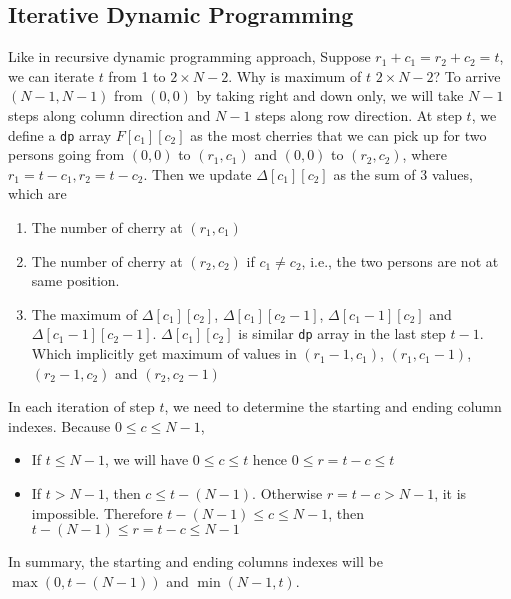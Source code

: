 \subsection{Iterative Dynamic Programming}
Like in recursive dynamic programming approach, Suppose $r_1+c_1=r_2+c_2=t$, we can iterate $t$ from 1 to $2\times N-2$. Why is maximum of $t$ $2\times N-2$? To arrive $(N-1,N-1)$ from $(0,0)$ by taking right and down only, we will take $N-1$ steps along column direction and $N-1$ steps along row direction. At step $t$, we define a \texttt{dp} array $F[c_1][c_2]$ as the most cherries that we can pick up for two persons going from $(0, 0)$ to $(r_1, c_1)$ and $(0, 0)$ to $(r_2, c_2)$, where $r_1 = t-c_1, r_2 = t-c_2$. Then we update $\Delta[c_1][c_2]$ as the sum of 3 values, which are 
\begin{enumerate}
\item The number of cherry at $(r_1, c_1)$
\item The number of cherry at $(r_2, c_2)$ if $c_1\neq c_2$, i.e., the two persons are not at same position.
\item The maximum of $\Delta[c_1][c_2]$, $\Delta[c_1][c_2-1]$, $\Delta[c_1-1][c_2]$ and $\Delta[c_1-1][c_2-1]$. $\Delta[c_1][c_2]$ is similar \texttt{dp} array in the last step $t-1$. Which implicitly get maximum of values in $(r_1-1, c_1)$, $(r_1, c_1-1)$, $(r_2-1, c_2)$ and $(r_2, c_2-1)$
\end{enumerate}
In each iteration of step $t$, we need to determine the starting and ending column indexes. Because $0\leq c\leq N-1$,
\begin{itemize}
\item If $t\leq N-1$, we will have $0\leq c \leq t$ hence $0\leq r=t-c\leq t$
\item If $t> N-1$, then $c \leq t-(N-1)$. Otherwise $r=t-c >N-1$, it is impossible. Therefore $t-(N-1) \leq c \leq N-1$, then $t-(N-1) \leq r=t-c\leq N-1$
\end{itemize}
In summary, the starting and ending columns indexes will be $\max(0, t-(N-1))$ and $\min(N-1, t)$.
